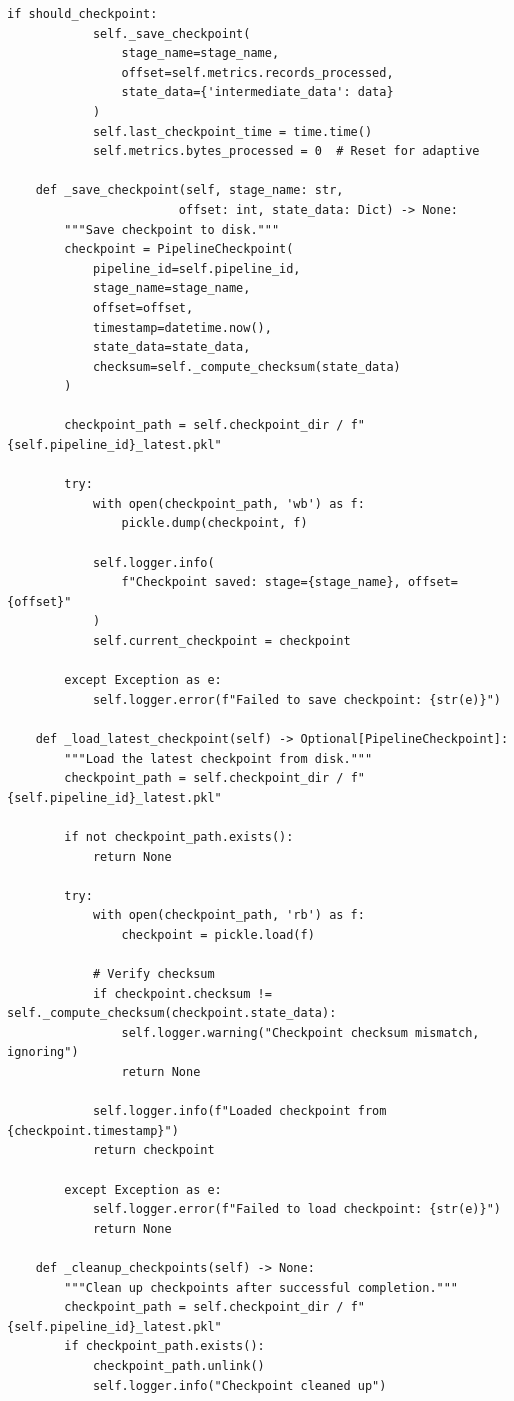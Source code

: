 \begin{lstlisting}[style=python, caption=DataPipeline with Full Lifecycle Management]
        if should_checkpoint:
            self._save_checkpoint(
                stage_name=stage_name,
                offset=self.metrics.records_processed,
                state_data={'intermediate_data': data}
            )
            self.last_checkpoint_time = time.time()
            self.metrics.bytes_processed = 0  # Reset for adaptive

    def _save_checkpoint(self, stage_name: str,
                        offset: int, state_data: Dict) -> None:
        """Save checkpoint to disk."""
        checkpoint = PipelineCheckpoint(
            pipeline_id=self.pipeline_id,
            stage_name=stage_name,
            offset=offset,
            timestamp=datetime.now(),
            state_data=state_data,
            checksum=self._compute_checksum(state_data)
        )

        checkpoint_path = self.checkpoint_dir / f"{self.pipeline_id}_latest.pkl"

        try:
            with open(checkpoint_path, 'wb') as f:
                pickle.dump(checkpoint, f)

            self.logger.info(
                f"Checkpoint saved: stage={stage_name}, offset={offset}"
            )
            self.current_checkpoint = checkpoint

        except Exception as e:
            self.logger.error(f"Failed to save checkpoint: {str(e)}")

    def _load_latest_checkpoint(self) -> Optional[PipelineCheckpoint]:
        """Load the latest checkpoint from disk."""
        checkpoint_path = self.checkpoint_dir / f"{self.pipeline_id}_latest.pkl"

        if not checkpoint_path.exists():
            return None

        try:
            with open(checkpoint_path, 'rb') as f:
                checkpoint = pickle.load(f)

            # Verify checksum
            if checkpoint.checksum != self._compute_checksum(checkpoint.state_data):
                self.logger.warning("Checkpoint checksum mismatch, ignoring")
                return None

            self.logger.info(f"Loaded checkpoint from {checkpoint.timestamp}")
            return checkpoint

        except Exception as e:
            self.logger.error(f"Failed to load checkpoint: {str(e)}")
            return None

    def _cleanup_checkpoints(self) -> None:
        """Clean up checkpoints after successful completion."""
        checkpoint_path = self.checkpoint_dir / f"{self.pipeline_id}_latest.pkl"
        if checkpoint_path.exists():
            checkpoint_path.unlink()
            self.logger.info("Checkpoint cleaned up")


\end{lstlisting}

